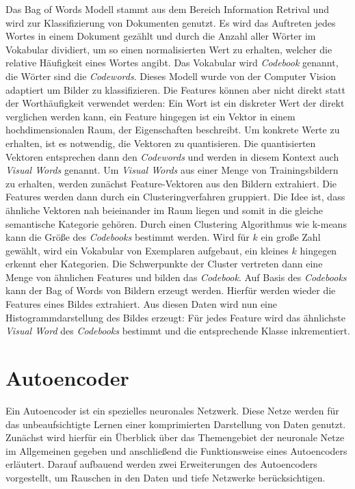 Das Bag of Words Modell stammt aus dem Bereich Information Retrival und wird zur Klassifizierung von Dokumenten genutzt. Es wird das Auftreten jedes Wortes in einem Dokument gezählt und durch die Anzahl aller Wörter im Vokabular dividiert, um so einen normalisierten Wert zu erhalten, welcher die relative Häufigkeit eines Wortes angibt. Das Vokabular wird \textit{Codebook} genannt, die Wörter sind die \textit{Codewords}.
Dieses Modell wurde von der Computer Vision adaptiert um Bilder zu klassifizieren. Die Features können aber nicht direkt statt der Worthäufigkeit verwendet werden: Ein Wort ist ein diskreter Wert der direkt verglichen werden kann, ein Feature hingegen ist ein Vektor in einem hochdimensionalen Raum, der Eigenschaften beschreibt. Um konkrete Werte zu erhalten, ist es notwendig, die Vektoren zu quantisieren. Die quantisierten Vektoren entsprechen dann den \textit{Codewords} und werden in diesem Kontext auch \textit{Visual Words} genannt. Um \textit{Visual Words} aus einer Menge von Trainingsbildern zu erhalten, werden zunächst Feature-Vektoren aus den Bildern extrahiert. Die Features werden dann durch ein Clusteringverfahren gruppiert. Die Idee ist, dass ähnliche Vektoren nah beieinander im Raum liegen und somit in die gleiche semantische Kategorie gehören. Durch einen Clustering Algorithmus wie k-means kann die Größe des \textit{Codebooks} bestimmt werden. Wird für $k$ ein große Zahl gewählt, wird ein Vokabular von Exemplaren aufgebaut, ein kleines $k$ hingegen erkennt eher Kategorien. Die Schwerpunkte der Cluster vertreten dann eine Menge von ähnlichen Features und bilden das \textit{Codebook}.
Auf Basis des \textit{Codebooks} kann der Bag of Words von Bildern erzeugt werden. Hierfür werden wieder die Features eines Bildes extrahiert. Aus diesen Daten wird nun eine Histogrammdarstellung des Bildes erzeugt: Für jedes Feature wird das ähnlichste \textit{Visual Word} des \textit{Codebooks} bestimmt und die entsprechende Klasse inkrementiert.



\section{Autoencoder}

Ein Autoencoder ist ein spezielles neuronales Netzwerk. Diese Netze werden für das unbeaufsichtigte Lernen einer komprimierten Darstellung von Daten genutzt. Zunächst wird hierfür ein Überblick über das Themengebiet der neuronale Netze im Allgemeinen gegeben und anschließend die Funktionsweise eines Autoencoders erläutert. Darauf aufbauend werden zwei Erweiterungen des Autoencoders vorgestellt, um Rauschen in den Daten und tiefe Netzwerke berücksichtigen.

